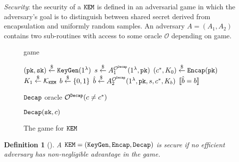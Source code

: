 \documentclass{article}
\newtheorem{definition}{Definition}[section]
\begin{document}
\emph{Security}: the security of a $\texttt{KEM}$ is defined in an adversarial game in which the adversary's goal is to distinguish between shared secret derived from encapsulation and uniformly random samples. An adversary $A = (A_1, A_2)$ contains two sub-routines with access to some oracle $\mathcal{O}$ depending on game.

\begin{figure}[H]
    \center
    \begin{minipage}{0.49\textwidth}
        \begin{algorithm}[H]
            \caption{ game}
            \begin{algorithmic}[1]
                \State $(\texttt{pk}, \texttt{sk}) \stackrel{\$}{\leftarrow} \texttt{KeyGen}(1^\lambda)$
                \State $s \stackrel{\$}{\leftarrow} A_1^{\mathcal{O}^\texttt{Decap}}(1^\lambda, \texttt{pk})$
                \State $(c^\ast, K_0) \stackrel{\$}{\leftarrow} \texttt{Encap}(\texttt{pk})$
                \State $K_1 \stackrel{\$}{\leftarrow} \mathcal{K}_\texttt{KEM}$
                \State $b \stackrel{\$}{\leftarrow} \{0, 1\}$
                \State $\hat{b} \stackrel{\$}{\leftarrow} A_2^{\mathcal{O}^\texttt{Decap}}(1^\lambda, \texttt{pk}, s, c^\ast, K_b)$
                \State \Return $[\![ \hat{b} = b ]\!]$
            \end{algorithmic}
        \end{algorithm}
    \end{minipage}
    \hfill
    \begin{minipage}{0.49\textwidth}
        \begin{algorithm}[H]
            \caption{$\texttt{Decap}$ oracle $\mathcal{O}^\texttt{Decap}(c \neq c^\ast)$}
            \begin{algorithmic}[1]
                \State \Return $\texttt{Decap}(\texttt{sk}, c)$
            \end{algorithmic}
        \end{algorithm}
    \end{minipage}
    \caption{The  game for $\texttt{KEM}$}\label{fig:kem-ind-cca2-game}
\end{figure}

\begin{definition}[]\label{def:kem-ind-cca2-security}
    A $\texttt{KEM} = (\texttt{KeyGen}, \texttt{Encap}, \texttt{Decap})$ is  secure if no efficient adversary has non-negligible advantage in the  game.
\end{definition}
\end{document}
